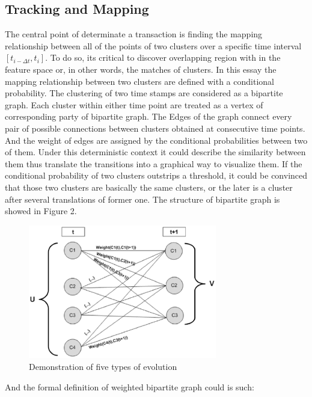 \documentclass{sig-alternate}
\begin{document}
\subsection{Tracking and Mapping}
The central point of determinate a transaction is finding the mapping relationship between all of the points of two clusters over a specific time interval $[t_{i-\Delta t}, t_i]$. To do so, its critical to discover overlapping region with in the feature space or, in other words, the matches of clusters. In this essay the mapping relationship between two clusters are defined with a conditional probability. The clustering of two time stamps are considered as a bipartite graph. Each cluster within either time point are treated as a vertex of corresponding party of bipartite graph. The Edges of the graph connect every pair of possible connections between clusters obtained at consecutive time points. And the weight of edges are assigned by the conditional probabilities between two of them. Under this deterministic context it could describe the similarity between them thus translate the transitions into a graphical way to visualize them. If the conditional probability of two clusters outstrips a threshold, it could be convinced that those two clusters are basically the same clusters, or the later is a cluster after several translations of former one. The structure of bipartite graph is showed in Figure 2.

\begin{figure}
  \centering
  \includegraphics[height=2.3in]{biparite_graph}
  \caption{Demonstration of five types of evolution}
\end{figure}

And the formal definition of weighted bipartite graph could is such:
\end{document}
